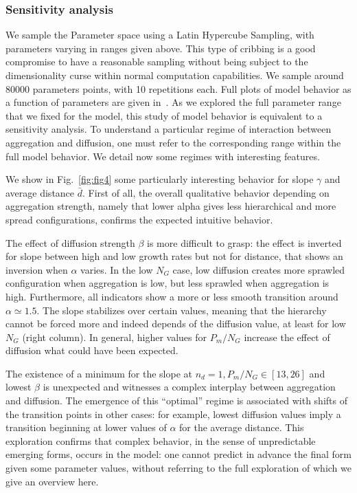 \documentclass[10pt,letterpaper]{article}
\begin{document}
\subsubsection*{Sensitivity analysis}



We sample the Parameter space using a Latin Hypercube Sampling, with parameters varying in ranges given above. This type of cribbing is a good compromise to have a reasonable sampling without being subject to the dimensionality curse within normal computation capabilities. We sample around 80000 parameters points, with 10 repetitions each. Full plots of model behavior as a function of parameters are given in~. As we explored the full parameter range that we fixed for the model, this study of model behavior is equivalent to a sensitivity analysis. To understand a particular regime of interaction between aggregation and diffusion, one must refer to the corresponding range within the full model behavior. We detail now some regimes with interesting features.

We show in Fig.~\ref{fig:fig4} some particularly interesting behavior for slope $\gamma$ and average distance $\bar{d}$. First of all, the overall qualitative behavior depending on aggregation strength, namely that lower alpha gives less hierarchical and more spread configurations, confirms the expected intuitive behavior.

The effect of diffusion strength $\beta$ is more difficult to grasp: the effect is inverted for slope between high and low growth rates but not for distance, that shows an inversion when $\alpha$ varies. In the low $N_G$ case, low diffusion creates more sprawled configuration when aggregation is low, but less sprawled when aggregation is high. Furthermore, all indicators show a more or less smooth transition around $\alpha \simeq 1.5$. The slope stabilizes over certain values, meaning that the hierarchy cannot be forced more and indeed depends of the diffusion value, at least for low $N_G$ (right column). In general, higher values for $P_m/N_G$ increase the effect of diffusion what could have been expected.

The existence of a minimum for the slope at $n_d=1,P_m/N_G\in\left[13,26\right]$ and lowest $\beta$ is unexpected and witnesses a complex interplay between aggregation and diffusion. The emergence of this ``optimal'' regime is associated with shifts of the transition points in other cases: for example, lowest diffusion values imply a transition beginning at lower values of $\alpha$ for the average distance. This exploration confirms that complex behavior, in the sense of unpredictable emerging forms, occurs in the model: one cannot predict in advance the final form given some parameter values, without referring to the full exploration of which we give an overview here.
\end{document}

